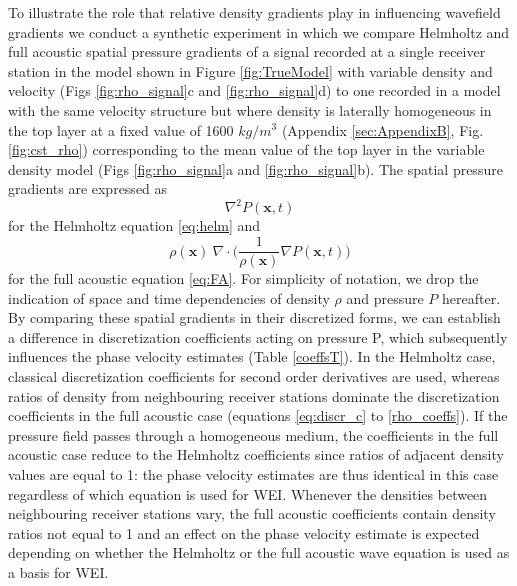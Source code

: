 \documentclass{article} %
\begin{document}
	To illustrate the role that relative density gradients play in influencing wavefield gradients we conduct a synthetic experiment in which we compare Helmholtz and full acoustic spatial pressure gradients of a signal recorded at a single receiver station in the model shown in Figure \ref{fig:TrueModel} with variable density and velocity (Figs \ref{fig:rho_signal}c and \ref{fig:rho_signal}d) to one recorded in a model with the same velocity structure but where density is laterally homogeneous in the top layer at a fixed value of 1600 $kg/m^{3}$ (Appendix \ref{sec:AppendixB}, Fig. \ref{fig:cst_rho}) corresponding to the mean value of the top layer in the variable density model (Figs \ref{fig:rho_signal}a and \ref{fig:rho_signal}b). The spatial pressure gradients are expressed as 
	\begin{equation}\label{eq:spatial_HELM}
	\nabla^{2} P(\bm{x},t)
	\end{equation}
	for the Helmholtz equation \ref{eq:helm} and 
	\begin{equation}\label{eq:spatial_FA}
		\rho(\bm{x}) \: \nabla \cdot \bigg(\frac{1}{\rho(\bm{x})} \nabla P(\bm{x},t) \bigg)
	\end{equation}
	for the full acoustic equation \eqref{eq:FA}. For simplicity of notation, we drop the indication of space and time dependencies of density $\rho$ and pressure $P$ hereafter. By comparing these spatial gradients in their discretized forms, we can establish a difference in discretization coefficients acting on pressure P, which subsequently influences the phase velocity estimates (Table \ref{coeffsT}). In the Helmholtz case, classical discretization coefficients for second order derivatives are used, whereas ratios of density from neighbouring receiver stations dominate the discretization coefficients in the full acoustic case (equations \ref{eq:discr_c} to \ref{rho_coeffs}). If the pressure field passes through a homogeneous medium, the coefficients in the full acoustic case reduce to the Helmholtz coefficients since ratios of adjacent density values are equal to 1: the phase velocity estimates are thus identical in this case regardless of which equation is used for WEI. Whenever the densities between neighbouring receiver stations vary, the full acoustic coefficients contain density ratios not equal to 1 and an effect on the phase velocity estimate is expected depending on whether the Helmholtz or the full acoustic wave equation is used as a basis for WEI.\\
\end{document}
